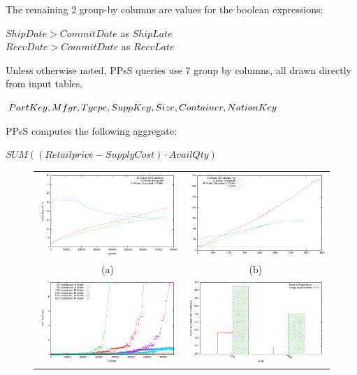 \noindent The remaining 2 group-by columns are values for the boolean expressions:

{\noindent $ShipDate > CommitDate$ as $ShipLate$\\
$RecvDate > CommitDate$ as $RecvLate$}

Unless otherwise noted, PPsS queries use 7 group by columns, all drawn directly from input tables.  

{\noindent $PartKey, Mfgr, Tyepe, SuppKey, \\
Size, Container, NationKey$}

PPsS computes the following aggregate:

{\noindent$SUM((Retailprice - SupplyCost) \cdot AvailQty)$}


\begin{figure}[t!]
\begin{center}
\begin{tabular}{cc}
\includegraphics[width=3.0in]{images/100mbUpdatesVsCPUCompletion.pdf} & \includegraphics[width=3.0in]{images/100mbUpdatesVsMemory.pdf}\\
(a) & (b) \\
\includegraphics[width=3.0in]{images/expandingbreakdown.pdf} & \includegraphics[width=3.0in]{images/foreignkey.pdf}\\

\end{tabular}
\end{center}
\end{figure}
